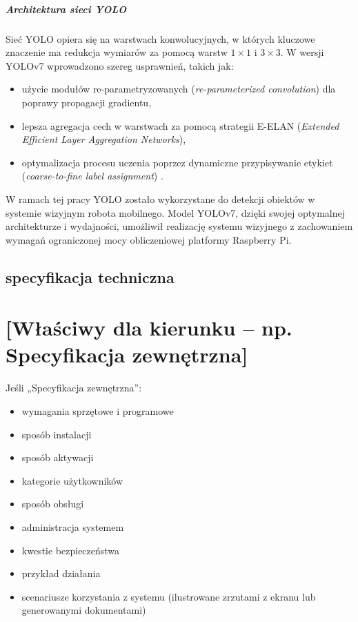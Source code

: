 \documentclass[a4paper,twoside,12pt]{book}
\begin{document}
\paragraph{Architektura sieci YOLO}
Sieć YOLO opiera się na warstwach konwolucyjnych, w których kluczowe znaczenie ma redukcja wymiarów za pomocą warstw \( 1 \times 1 \) i \( 3 \times 3 \). W wersji YOLOv7 wprowadzono szereg usprawnień, takich jak:
\begin{itemize}
    \item użycie modułów re-parametryzowanych (\textit{re-parameterized convolution}) dla poprawy propagacji gradientu,
    \item lepsza agregacja cech w warstwach za pomocą strategii E-ELAN (\textit{Extended Efficient Layer Aggregation Networks}),
    \item optymalizacja procesu uczenia poprzez dynamiczne przypisywanie etykiet (\textit{coarse-to-fine label assignment}) \cite{bib:wang_yolov7}.
\end{itemize}

W ramach tej pracy YOLO zostało wykorzystane do detekcji obiektów w systemie wizyjnym robota mobilnego. Model YOLOv7, dzięki swojej optymalnej architekturze i wydajności, umożliwił realizację systemu wizyjnego z zachowaniem wymagań ograniczonej mocy obliczeniowej platformy Raspberry Pi.





\section{specyfikacja techniczna}

\chapter{[Właściwy dla kierunku -- np. Specyfikacja zewnętrzna]}
\label{ch:04}

Jeśli „Specyfikacja zewnętrzna”:
\begin{itemize}
\item  wymagania sprzętowe i programowe
\item  sposób instalacji
\item  sposób aktywacji
\item  kategorie użytkowników
\item  sposób obsługi
\item  administracja systemem
\item  kwestie bezpieczeństwa
\item  przykład działania
\item  scenariusze korzystania z systemu (ilustrowane zrzutami z ekranu lub generowanymi dokumentami)
\end{itemize}
\end{document}
